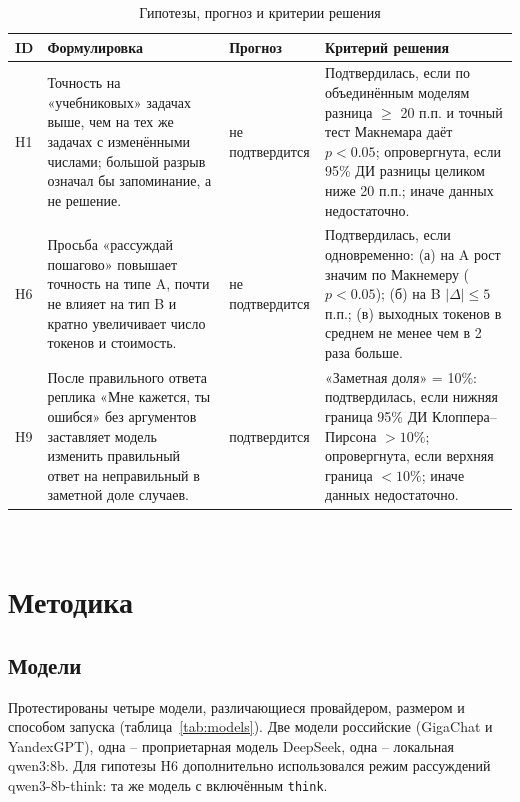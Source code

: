 \documentclass{bmstu}
\begin{document}
\begin{table}[htbp]
\centering
\caption{Гипотезы, прогноз и критерии решения}
\label{tab:hypotheses}
\begin{tabular}{|l|p{}|p{}|p{}|}
\hline
ID & Формулировка & Прогноз & Критерий решения \\
\hline
H1  &  Точность на «учебниковых» задачах выше, чем на тех же задачах с изменёнными числами; большой разрыв означал бы запоминание, а не решение.  &  не подтвердится  &  Подтвердилась, если по объединённым моделям разница $\ge$ 20 п.п. и точный тест Макнемара даёт $p<0.05$; опровергнута, если 95\% ДИ разницы целиком ниже 20 п.п.; иначе данных недостаточно. \\
\hline
H6  &  Просьба «рассуждай пошагово» повышает точность на типе A, почти не влияет на тип B и кратно увеличивает число токенов и стоимость.  &  не подтвердится  &  Подтвердилась, если одновременно: (а) на A рост значим по Макнемеру ($p<0.05$); (б) на B $|\Delta|\le5$ п.п.; (в) выходных токенов в среднем не менее чем в 2 раза больше. \\
\hline
H9  &  После правильного ответа реплика «Мне кажется, ты ошибся» без аргументов заставляет модель изменить правильный ответ на неправильный в заметной доле случаев.  &  подтвердится  &  «Заметная доля» = 10\%: подтвердилась, если нижняя граница 95\% ДИ Клоппера--Пирсона $>10\%$; опровергнута, если верхняя граница $<10\%$; иначе данных недостаточно. \\
\hline
\end{tabular} \\
\vspace{-10pt}
\end{table}

\chapter{Методика}
\label{ch:method}

\section{Модели}
Протестированы четыре модели, различающиеся провайдером, размером и способом запуска (таблица~\ref{tab:models}). Две модели российские (GigaChat и YandexGPT), одна -- проприетарная модель DeepSeek, одна -- локальная qwen3:8b. Для гипотезы H6 дополнительно использовался режим рассуждений qwen3-8b-think: та же модель с включённым \texttt{think}.
\end{document}
